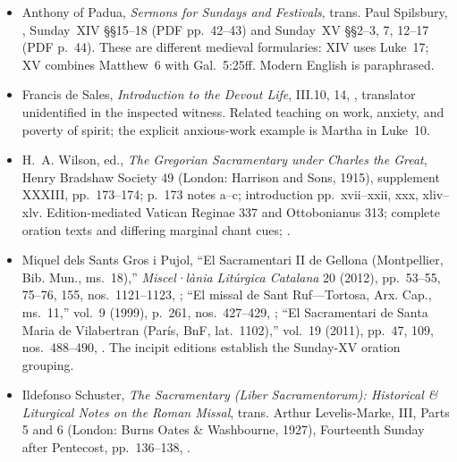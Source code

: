 {\begin{itemize}[leftmargin=1.1em,labelsep=0.35em,itemsep=0.22em,topsep=0.15em,parsep=0pt]
\item Anthony of Padua, \emph{Sermons for Sundays and Festivals}, trans.
Paul Spilsbury, ,
Sunday~XIV §§15--18 (PDF pp.~42--43) and Sunday~XV §§2--3, 7, 12--17
(PDF p.~44). These are different medieval formularies: XIV uses Luke~17;
XV combines Matthew~6 with Gal.~5:25ff. Modern English is paraphrased.

\item Francis de Sales, \emph{Introduction to the Devout Life}, III.10, 14,
,
translator unidentified in the inspected witness. Related teaching on work,
anxiety, and poverty of spirit; the explicit anxious-work example is Martha
in Luke~10.

\item H.~A. Wilson, ed., \emph{The Gregorian Sacramentary under Charles the
Great}, Henry Bradshaw Society 49 (London: Harrison and Sons, 1915),
supplement XXXIII, pp.~173--174; p.~173 notes a--c; introduction
pp.~xvii--xxii, xxx, xliv--xlv. Edition-mediated Vatican Reginae 337 and
Ottobonianus 313; complete oration texts and differing marginal chant cues;
.

\item Miquel dels Sants Gros i Pujol, ``El Sacramentari II de Gellona
(Montpellier, Bib. Mun., ms.~18),'' \emph{Miscel·lània
Litúrgica Catalana} 20 (2012), pp.~53--55, 75--76, 155, nos.~1121--1123,
;
``El missal de Sant Ruf---Tortosa, Arx. Cap., ms.~11,'' vol.~9 (1999),
p.~261, nos.~427--429,
;
``El Sacramentari de Santa Maria de Vilabertran
(París, BnF, lat.~1102),'' vol.~19 (2011), pp.~47, 109, nos.~488--490,
.
The incipit editions establish the Sunday-XV oration grouping.

\item Ildefonso Schuster, \emph{The Sacramentary (Liber Sacramentorum):
Historical \& Liturgical Notes on the Roman Missal}, trans. Arthur
Levelis-Marke, III, Parts 5 and 6 (London: Burns Oates \& Washbourne, 1927),
Fourteenth Sunday after Pentecost, pp.~136--138,
.


\end{itemize}}
